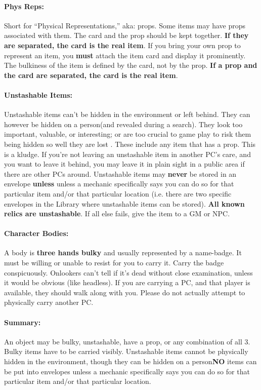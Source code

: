 \documentclass[sheet]{GL2020}
\begin{document}
\paragraph{Phys Reps:} Short for ``Physical Representations,'' aka: props. Some items may have props associated with them. The card and the prop should be kept together. \textbf{If they are separated, the card is the real item}. If you bring your own prop to represent an item, you \textbf{must} attach the item card and display it prominently. The bulkiness of the item is defined by the card, not by the prop. \textbf{If a prop and the card are separated, the card is the real item}.

\paragraph{Unstashable Items:} Unstashable items can't be hidden in the environment or left behind. They can however be hidden on a person(and revealed during a search). They look too important, valuable, or interesting; or are too crucial to game play to risk them being hidden so well they are lost . These include any item that has a prop. This is a kludge. If you're not leaving an unstashable item in another PC's care, and you want to leave it behind, you may leave it in plain sight in a public area if there are other PCs around. Unstashable items may \textbf{never} be stored in an envelope \textbf{unless} unless a mechanic specifically says you can do so for that particular item and/or that particular location (i.e. there are two specific envelopes in the Library where unstashable items can be stored). \textbf{All known relics are unstashable}. If all else fails, give the item to a GM or NPC.

\paragraph{Character Bodies:} A body is {\bf three hands bulky} and usually represented by a name-badge. It must be willing or unable to resist for you to carry it. Carry the badge conspicuously. Onlookers can't tell if it's dead without close examination, unless it would be obvious (like headless). If you are carrying a PC, and that player is available, they should walk along with you. Please do not actually attempt to physically carry another PC.

\paragraph{Summary:} An object may be bulky, unstashable, have a prop, or any combination of all 3. Bulky items have to be carried visibly. Unstashable items cannot be physically hidden in the environment, though they can be hidden on a person\textbf{NO} items can be put into envelopes unless a mechanic specifically says you can do so for that particular item and/or that particular location.
\end{document}
